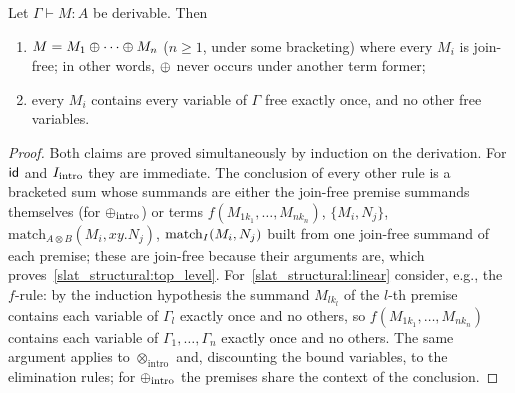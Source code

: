 \begin{lemma}
\label{lemma:slat_structural}
Let $\Gamma \vdash M : A$ be derivable.  Then
\begin{enumerate}
  \item\label{slat_structural:top_level} $M = M_1 \mathbin{\oplus} \cdots \mathbin{\oplus} M_n$ ($n \geq 1$, under some bracketing) where every $M_i$ is join-free; in other words, $\mathbin{\oplus}$ never occurs under another term former;
  \item\label{slat_structural:linear} every $M_i$ contains every variable of $\Gamma$ free exactly once, and no other free variables.
\end{enumerate}
\end{lemma}
\begin{proof}
Both claims are proved simultaneously by induction on the derivation.
For $\textsf{id}$ and $I_{\text{intro}}$ they are immediate.
The conclusion of every other rule is a bracketed sum whose summands are either the join-free premise summands themselves (for $\mathbin{\oplus}_{\text{intro}}$) or terms $f(M_{1 k_1}, \ldots, M_{n k_n})$, $\{M_i, N_j\}$, $\text{match}_{A \otimes B}(M_i, xy.N_j)$, $\text{match}_{I}(M_i, N_j)$ built from one join-free summand of each premise; these are join-free because their arguments are, which proves~\ref{slat_structural:top_level}.
For~\ref{slat_structural:linear} consider, e.g., the $f$-rule: by the induction hypothesis the summand $M_{l k_l}$ of the $l$-th premise contains each variable of $\Gamma_l$ exactly once and no others, so $f(M_{1 k_1}, \ldots, M_{n k_n})$ contains each variable of $\Gamma_1, \ldots, \Gamma_n$ exactly once and no others.
The same argument applies to $\otimes_{\text{intro}}$ and, discounting the bound variables, to the elimination rules; for $\mathbin{\oplus}_{\text{intro}}$ the premises share the context of the conclusion.
\end{proof}

